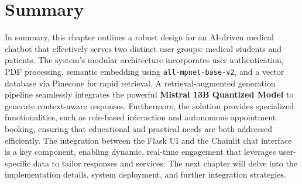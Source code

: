 \section{Summary}
\label{sec:methodology_summary}
In summary, this chapter outlines a robust design for an AI-driven medical chatbot that effectively serves two distinct user groups: medical students and patients. The system's modular architecture incorporates user authentication, PDF processing, semantic embedding using \texttt{all-mpnet-base-v2}, and a vector database via Pinecone for rapid retrieval. A retrieval-augmented generation pipeline seamlessly integrates the powerful \textbf{Mistral 13B Quantized Model} to generate context-aware responses. Furthermore, the solution provides specialized functionalities, such as role-based interaction and autonomous appointment booking, ensuring that educational and practical needs are both addressed efficiently. The integration between the Flask UI and the Chainlit chat interface is a key component, enabling dynamic, real-time engagement that leverages user-specific data to tailor responses and services. The next chapter will delve into the implementation details, system deployment, and further integration strategies.

